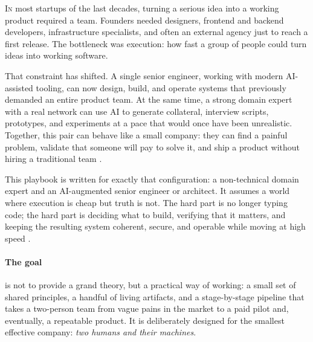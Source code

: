 \documentclass[10pt, a4paper, twocolumn]{article} %
\begin{document}
\newcommand{\DomainLead}{domain expert}
\newcommand{\BuildLead}{senior engineer/architect}

\color{white}
\hypersetup{citecolor=white} %


\vspace*{\fill}

\noindent
\makeatletter
\@date\par
\makeatother

\vspace*{0.2cm}

\lettrine[lines=3,lhang=0.1,findent=1pt]{I}n most startups of the last decades, turning a serious idea into a working product required a team. Founders needed designers, frontend and backend developers, infrastructure specialists, and often an external agency just to reach a first release. The bottleneck was execution: how fast a group of people could turn ideas into working software.

That constraint has shifted. A single senior engineer, working with modern AI-assisted tooling, can now design, build, and operate systems that previously demanded an entire product team. At the same time, a strong domain expert with a real network can use AI to generate collateral, interview scripts, prototypes, and experiments at a pace that would once have been unrealistic. Together, this pair can behave like a small company: they can find a painful problem, validate that someone will pay to solve it, and ship a product without hiring a traditional team \citep{ries2011lean,bland2019testing,fitzpatrick2013mom,osterwalder2014vpd,blomgren2025coordination}.

\newpage

\vspace*{\fill}

This playbook is written for exactly that configuration: a non-technical domain expert and an AI-augmented senior engineer or architect. It assumes a world where execution is cheap but truth is not. The hard part is no longer typing code; the hard part is deciding what to build, verifying that it matters, and keeping the resulting system coherent, secure, and operable while moving at high speed \citep{forsgren2018accelerate,blomgren2025coordination}.

\paragraph{The goal} is not to provide a grand theory, but a practical way of working: a small set of shared principles, a handful of living artifacts, and a stage-by-stage pipeline that takes a two-person team from vague pains in the market to a paid pilot and, eventually, a repeatable product. It is deliberately designed for the smallest effective company: \textit{two humans and their machines}.
\end{document}

